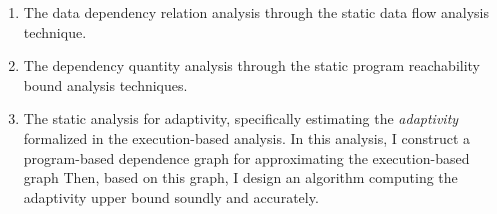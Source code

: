 \begin{enumerate}
\begin{enumerate}
\item The data dependency relation analysis through the static data flow analysis technique.
\item The dependency quantity analysis through the static program reachability bound analysis techniques.
\item 
The static analysis for adaptivity, specifically estimating the \emph{adaptivity} formalized in the execution-based analysis.
In this analysis, I construct a program-based dependence graph for approximating the execution-based graph
Then, based on this graph, I design an algorithm
computing the adaptivity upper bound soundly 
and accurately.
\end{enumerate}
\end{enumerate}%


